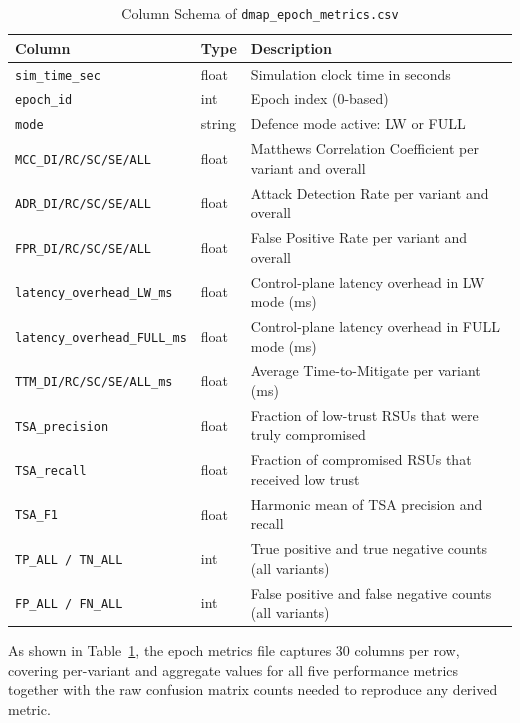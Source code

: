 \begin{table}[htb]
\centering
\caption{Column Schema of \texttt{dmap\_epoch\_metrics.csv}}
\label{tab:epoch_schema}
\scriptsize
\setlength{\tabcolsep}{3pt}
\begin{tabular}{lll}
\hline
\textbf{Column} & \textbf{Type} & \textbf{Description} \\
\hline
\texttt{sim\_time\_sec}              & float  &
  Simulation clock time in seconds \\
\texttt{epoch\_id}                   & int    &
  Epoch index (0-based) \\
\texttt{mode}                        & string &
  Defence mode active: LW or FULL \\
\texttt{MCC\_DI/RC/SC/SE/ALL}        & float  &
  Matthews Correlation Coefficient per variant and overall \\
\texttt{ADR\_DI/RC/SC/SE/ALL}        & float  &
  Attack Detection Rate per variant and overall \\
\texttt{FPR\_DI/RC/SC/SE/ALL}        & float  &
  False Positive Rate per variant and overall \\
\texttt{latency\_overhead\_LW\_ms}   & float  &
  Control-plane latency overhead in LW mode (ms) \\
\texttt{latency\_overhead\_FULL\_ms} & float  &
  Control-plane latency overhead in FULL mode (ms) \\
\texttt{TTM\_DI/RC/SC/SE/ALL\_ms}    & float  &
  Average Time-to-Mitigate per variant (ms) \\
\texttt{TSA\_precision}              & float  &
  Fraction of low-trust RSUs that were truly compromised \\
\texttt{TSA\_recall}                 & float  &
  Fraction of compromised RSUs that received low trust \\
\texttt{TSA\_F1}                     & float  &
  Harmonic mean of TSA precision and recall \\
\texttt{TP\_ALL / TN\_ALL}           & int    &
  True positive and true negative counts (all variants) \\
\texttt{FP\_ALL / FN\_ALL}           & int    &
  False positive and false negative counts (all variants) \\
\hline
\end{tabular}
\end{table}

As shown in Table~\ref{tab:epoch_schema}, the epoch
metrics file captures 30 columns per row, covering
per-variant and aggregate values for all five
performance metrics together with the raw confusion
matrix counts needed to reproduce any derived metric.

